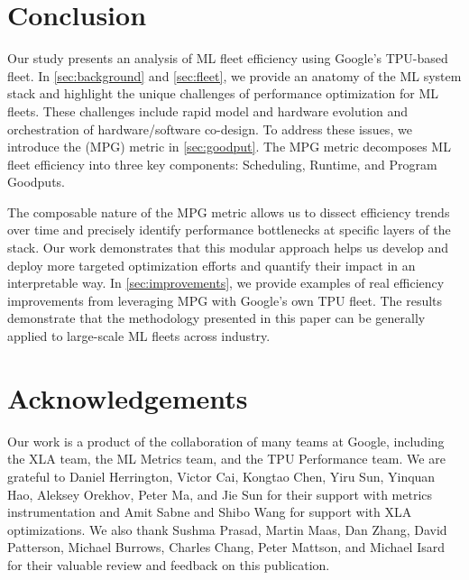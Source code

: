 \section{Conclusion}

Our study presents an analysis of ML fleet efficiency using Google's TPU-based fleet. In \autoref{sec:background} and \autoref{sec:fleet}, we provide an anatomy of the ML system stack and highlight the unique challenges of performance optimization for ML fleets. These challenges include rapid model and hardware evolution and orchestration of hardware/software co-design. To address these issues, we introduce the \mpg (MPG) metric in \autoref{sec:goodput}. The MPG metric decomposes ML fleet efficiency into three key components: Scheduling, Runtime, and Program Goodputs. 

The composable nature of the MPG metric allows us to dissect efficiency trends over time and precisely identify performance bottlenecks at specific layers of the stack. Our work demonstrates that this modular approach helps us develop and deploy more targeted optimization efforts and quantify their impact in an interpretable way. In \autoref{sec:improvements}, we provide examples of real efficiency improvements from leveraging MPG with Google's own TPU fleet. The results demonstrate that the methodology presented in this paper can be generally applied to large-scale ML fleets across industry.


\section{Acknowledgements}
Our work is a product of the collaboration of many teams at Google, including the XLA team, the ML Metrics team, and the TPU Performance team. We are grateful to Daniel Herrington, Victor Cai, Kongtao Chen, Yiru Sun, Yinquan Hao, Aleksey Orekhov, Peter Ma, and Jie Sun for their support with metrics instrumentation and Amit Sabne and Shibo Wang for support with XLA optimizations. We also thank Sushma Prasad, Martin Maas, Dan Zhang, David Patterson, Michael Burrows, Charles Chang, Peter Mattson, and Michael Isard for their valuable review and feedback on this publication.
